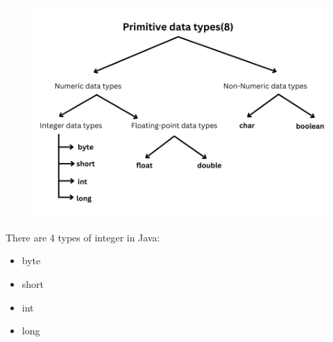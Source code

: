 
\setlength{\columnsep}{5pt}

\begin{flushleft}
	
	

	\begin{figure}[h!]
		\centering
		\includegraphics[scale=.6]{content/chapter2/images/primitive.png}
	\end{figure}
	
	There are 4 types of integer in Java:
	\begin{itemize}
		\item byte
		\item short
		\item int
		\item long
	\end{itemize}	
	
	
\end{flushleft}

\newpage